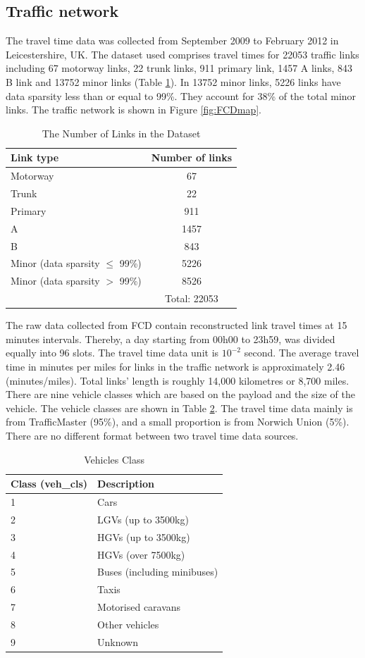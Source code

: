 \documentclass[journal]{IEEEtran}
\begin{document}
\subsection{Traffic network}
The travel time data was collected from September 2009 to February 2012 in Leicestershire, UK. The dataset used comprises travel times for 22053 traffic links including 67 motorway links, 22 trunk links, 911 primary link, 1457 A links, 843 B link and 13752 minor links (Table \ref{table:numlinkonFCD}). In 13752 minor links, 5226 links have data sparsity less than or equal to 99\%. They account for 38\% of the total minor links. The traffic network is shown in Figure \ref{fig:FCDmap}. 
\begin{table}[!t]
	\caption{The Number of Links in the Dataset}
	\label{table:numlinkonFCD}
	\begin{tabular}{lc}
		\hline
		Link type&	Number of links\\
		\hline
		Motorway& 67\\
		Trunk&	22\\
		Primary& 911\\
		A&	1457\\
		B&	843\\
		Minor (data sparsity $\le$ 99\%)& 5226\\
		Minor (data sparsity $>$ 99\%)&	8526\\
		\hline
		&	Total: 22053\\
	\end{tabular}
\end{table}
The raw data collected from FCD contain reconstructed link travel times at 15 minutes intervals. Thereby, a day starting from 00h00 to 23h59, was divided equally into 96 slots. The travel time data unit is  $10^{-2}$ second. The average travel time in minutes per miles for links in the traffic network is approximately 2.46 (minutes/miles). Total links' length is roughly 14,000 kilometres or 8,700 miles. There are nine vehicle classes which are based on the payload and the size of the vehicle. The vehicle classes are shown in Table \ref{table:FCDvehiclecategory}. The travel time data mainly is from TrafficMaster (95\%), and a small proportion is from Norwich Union (5\%). There are no different format between two travel time data sources.
\begin{table}[!t]
	\caption{Vehicles Class}
	\label{table:FCDvehiclecategory}
	\begin{tabular}{ll}
		\hline
		Class (veh\_cls)&	Description\\
		\hline
		1&	Cars\\
		2&	LGVs (up to 3500kg)\\
		3&	HGVs (up to 3500kg)\\
		4&	HGVs (over 7500kg)\\
		5&	Buses (including minibuses)\\
		6&	Taxis\\
		7&	Motorised caravans\\
		8&	Other vehicles\\
		9&	Unknown\\
		\hline
	\end{tabular}
\end{table}
\end{document}
